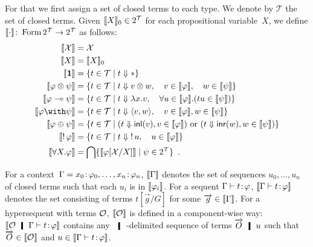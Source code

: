 For that we first assign a set of closed terms to each type.
\newcommand{\terms}{\mathcal{T}}
We denote by $\terms$ the set of closed terms.
Given $\semo{X}_0\in 2^\terms$ for each propositional variable~$X$,
we define $\semo{\cdot}\colon \form{2^\terms}\rightarrow {2^\terms}$
as follows:
\begin{align*}
 \semo{\mathcal X} &= \mathcal X\\
 \semo{X} &= \semo{X}_0\\
 \semo{\one} &= \{t\in \terms \mid t\eval \ast\} \\
 \semo{\phi\otimes \psi}&= \{t\in\terms \mid t\eval v\otimes w,\quad
 v\in\semo{\phi},\quad w\in \semo{\psi}\}\\
 \semo{\phi\limp\psi}&= \{t\in\terms \mid t\eval \lambda x.v,\quad
 \forall u\in\semo{\phi}.(tu\in\semo{\psi})\}\\
 \semo{\phi\with\psi}&= \{t\in\terms \mid t\eval\lpair{v,w},\quad
 v\in\semo{\phi}, w\in\semo{\psi}\}\\
 \semo{\phi\oplus\psi}&= \{t\in\terms\mid (t\eval \inl{v}, v\in
 \semo{\phi})\text{ or }(t\eval\inr{w}, w \in \semo{\psi})\}\\
 \semo{\bang \phi}&= \{t\in\terms \mid t\eval \bang u, \quad u\in\semo{\phi}\}\\
 \semo{\forall X.\phi}&= \bigcap\{\semo{\phi[\mathcal X/X]}\mid \psi\in
 2^\terms\}\enspace.
\end{align*}

For a context~$\Gamma = {x_0} \mathord{\colon\kern -2pt}{\varphi_0},\ldots,{x_n} \mathord{\colon\kern -2pt}{\varphi_n}$,
$\llbracket{\Gamma}\rrbracket$ denotes the set of sequences $u_0,\ldots,u_n$ of closed terms
such that each $u_i$ is in $\llbracket{\varphi_i}\rrbracket$.
For a sequent $\Gamma\vdash{t} \mathord{\colon\kern -2pt}{\varphi}$, $\llbracket{\Gamma\vdash {t} \mathord{\colon\kern -2pt}{\varphi} }\rrbracket$ denotes
the set consisting of terms $t[\vec g/G]$ for some $\overrightarrow g\in\llbracket{\Gamma}\rrbracket$.
For a hypersequent with terms $\mathcal{O}$,
$\llbracket{\mathcal{O}}\rrbracket$ is defined in a component-wise way:
$\semo{\hypert\hmid\G\tr\tj t\phi}$ contains any $\hmid$-delimited
sequence of terms
$\vec O \hmid u$ such that $\overrightarrow O\in\llbracket{\mathcal{O}}\rrbracket$ and
$u\in\llbracket{\Gamma\vdash {t} \mathord{\colon\kern -2pt}{\varphi} }\rrbracket$.


